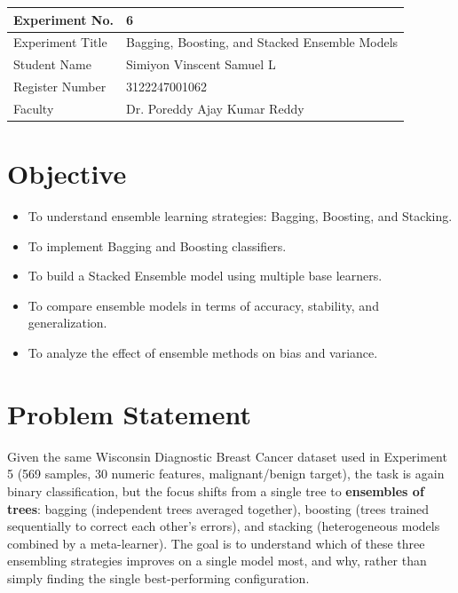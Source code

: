 \documentclass[12pt,a4paper]{article}
\begin{document}
\begin{tabular}{|p{4cm}|p{11cm}|}
\hline
Experiment No. & 6 \\ \hline
Experiment Title & Bagging, Boosting, and Stacked Ensemble Models\footnotemark\\ \hline
Student Name & Simiyon Vinscent Samuel L \\ \hline
Register Number & 3122247001062 \\ \hline
Faculty & Dr. Poreddy Ajay Kumar Reddy \\ \hline
\end{tabular}

\section{Objective}
\begin{itemize}[nosep]
\item To understand ensemble learning strategies: Bagging, Boosting, and Stacking.
\item To implement Bagging and Boosting classifiers.
\item To build a Stacked Ensemble model using multiple base learners.
\item To compare ensemble models in terms of accuracy, stability, and generalization.
\item To analyze the effect of ensemble methods on bias and variance.
\end{itemize}

\section{Problem Statement}
Given the same Wisconsin Diagnostic Breast Cancer dataset used in Experiment 5 (569 samples, 30
numeric features, malignant/benign target), the task is again binary classification, but the
focus shifts from a single tree to \textbf{ensembles of trees}: bagging (independent trees
averaged together), boosting (trees trained sequentially to correct each other's errors), and
stacking (heterogeneous models combined by a meta-learner). The goal is to understand which of
these three ensembling strategies improves on a single model most, and why, rather than simply
finding the single best-performing configuration.
\end{document}
